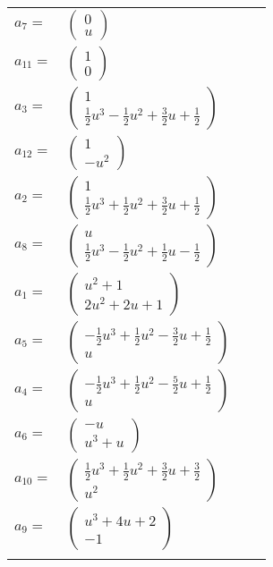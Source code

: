 \documentclass[1p]{elsarticle_modified}
\theoremstyle{definition}
\begin{document}
\begin{tabular}{m{7pt} m{180pt} m{7pt} m{180pt} }
\flushright $a_{7}=$&$\begin{pmatrix}0\\u\end{pmatrix}$ \\
\flushright $a_{11}=$&$\begin{pmatrix}1\\0\end{pmatrix}$ \\
\flushright $a_{3}=$&$\begin{pmatrix}1\\\frac{1}{2} u^3-\frac{1}{2} u^2+\frac{3}{2} u+\frac{1}{2}\end{pmatrix}$ \\
\flushright $a_{12}=$&$\begin{pmatrix}1\\- u^2\end{pmatrix}$ \\
\flushright $a_{2}=$&$\begin{pmatrix}1\\\frac{1}{2} u^3+\frac{1}{2} u^2+\frac{3}{2} u+\frac{1}{2}\end{pmatrix}$ \\
\flushright $a_{8}=$&$\begin{pmatrix}u\\\frac{1}{2} u^3-\frac{1}{2} u^2+\frac{1}{2} u-\frac{1}{2}\end{pmatrix}$ \\
\flushright $a_{1}=$&$\begin{pmatrix}u^2+1\\2 u^2+2 u+1\end{pmatrix}$ \\
\flushright $a_{5}=$&$\begin{pmatrix}-\frac{1}{2} u^3+\frac{1}{2} u^2-\frac{3}{2} u+\frac{1}{2}\\u\end{pmatrix}$ \\
\flushright $a_{4}=$&$\begin{pmatrix}-\frac{1}{2} u^3+\frac{1}{2} u^2-\frac{5}{2} u+\frac{1}{2}\\u\end{pmatrix}$ \\
\flushright $a_{6}=$&$\begin{pmatrix}- u\\u^3+u\end{pmatrix}$ \\
\flushright $a_{10}=$&$\begin{pmatrix}\frac{1}{2} u^3+\frac{1}{2} u^2+\frac{3}{2} u+\frac{3}{2}\\u^2\end{pmatrix}$ \\
\flushright $a_{9}=$&$\begin{pmatrix}u^3+4 u+2\\-1\end{pmatrix}$\\&\end{tabular}
\end{document}
